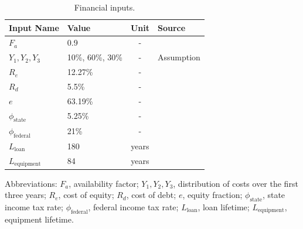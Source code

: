 \documentclass{article}
\begin{document}
\begin{table}[H]
  \centering
  \caption{Financial inputs.}
  \label{table:financial_inputs}
  \begin{threeparttable}
    \begin{tabular}{@{}lp{6cm}cp{2cm}@{}}
      \toprule
      \textbf{Input Name} & \textbf{Value} & \textbf{Unit} & \textbf{Source} \\ \midrule
      $F_a$ & 0.9 & - & \cite{LEWIS2022} \\
      $Y_1,Y_2,Y_3$ & 10\%, 60\%, 30\% & - & Assumption \\
      $R_e$ & 12.27\% & - & \cite{Damodaran2023} \\
      $R_d$ & 5.5\% & - & \cite{Damodaran2023} \\
      $e$ & 63.19\% & - & \cite{Damodaran2023} \\
      $\phi_{\text{state}}$ & 5.25\% & - & \\
      $\phi_{\text{federal}}$ & 21\% & - & \\
      $L_{\text{loan}}$ & 180 & years & \cite{LEWIS2022} \\
      $L_{\text{equipment}}$ & 84 & years & \cite{Turton2018} \\ \bottomrule
    \end{tabular}
    \begin{tablenotes}
  \small
  \item Abbreviations: $F_a$, availability factor; $Y_1, Y_2, Y_3$, distribution of costs over the first three years; $R_e$, cost of equity; $R_d$, cost of debt; $e$, equity fraction; $\phi_{\text{state}}$, state income tax rate; $\phi_{\text{federal}}$, federal income tax rate; $L_{\text{loan}}$, loan lifetime; $L_{\text{equipment}}$, equipment lifetime.
\end{tablenotes}

  \end{threeparttable}
\end{table}
\end{document}
